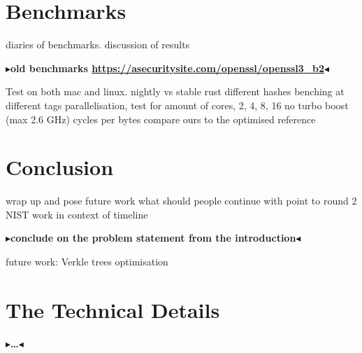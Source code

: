 \documentclass[twoside,11pt]{report}
\theoremstyle{definition}
\theoremstyle{plain}
\newcommand{\todo}[1]{{\color[rgb]{.5,0,0}\textbf{$\blacktriangleright$#1$\blacktriangleleft$}}}
\begin{document}


\chapter{Benchmarks}\label{ch:bench}
diaries of benchmarks.
discussion of results

\todo{old benchmarks \url{https://asecuritysite.com/openssl/openssl3_b2}}

Test on both mac and linux.
nightly vs stable rust
different hashes
benching at different tags
parallelisation, test for amount of cores, 2, 4, 8, 16
no turbo boost (max 2.6 GHz)
cycles per bytes
compare ours to the optimised reference


\chapter{Conclusion}\label{ch:conclusion}

wrap up and pose future work
what should people continue with
point to round 2 NIST
work in context of timeline

\todo{conclude on the problem statement from the introduction}

future work: Verkle trees optimisation


\cleardoublepage
{}




\cleardoublepage
\appendix
\chapter{The Technical Details}

\todo{\dots}
\end{document}
